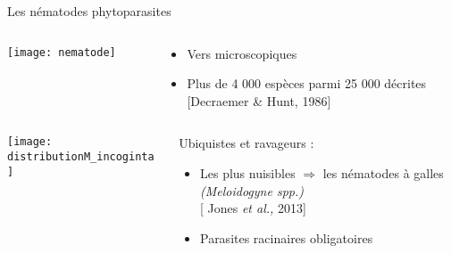 \begin{frame}{Les nématodes phytoparasites}
\vspace{-0.1cm}
\begin{columns}

 \hspace{3mm}
 \begin{column}{.3\textwidth}

\texttt{[image: nematode]}    
 \end{column}

 \begin{column}{.8\textwidth} 

\begin{itemize}[leftmargin=-0.5cm]
\item Vers microscopiques
\item Plus de 4 000 espèces parmi 25 000 décrites \\ \textcolor{shadecolor}{{\small [Decraemer \& Hunt, 1986]}}
\end{itemize}

 \end{column}
\end{columns}

\vfill
\begin{columns}
\hspace{3mm}
 \begin{column}{.3\textwidth}     
 
\vspace{5mm}
  \texttt{[image: distributionM\_incoginta]} 
 \end{column}

 \begin{column}{.8\textwidth}
 \hspace{-5mm}\alert{ Ubiquistes et ravageurs :}
            \begin{itemize}[leftmargin=-0.5cm]
            
\item Les plus nuisibles $\Rightarrow$ les nématodes à galles \textit{(Meloidogyne spp.)} \\ 
 \textcolor{shadecolor}{{\small[ Jones \textit{et al.,} 2013]}}
\item Parasites racinaires obligatoires 

            \end{itemize}
 \end{column}
\end{columns} 


\end{frame}
